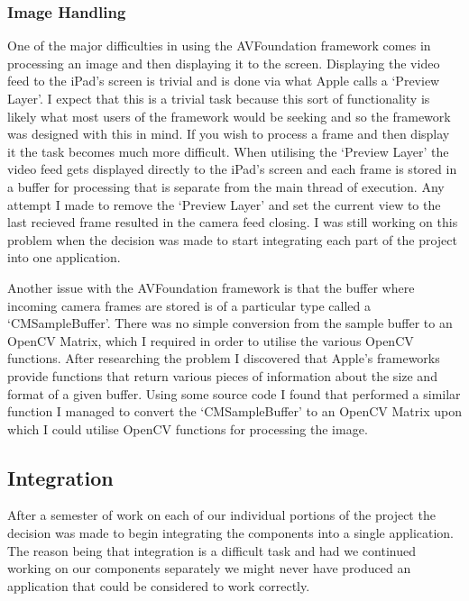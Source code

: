 \documentclass{article}
\begin{document}
\subsubsection{Image Handling}

One of the major difficulties in using the AVFoundation framework comes in processing an image and then displaying it to the screen. Displaying the video feed to the iPad's screen is trivial and is done via what Apple calls a `Preview Layer'. I expect that this is a trivial task because this sort of functionality is likely what most users of the framework would be seeking and so the framework was designed with this in mind. If you wish to process a frame and then display it the task becomes much more difficult. When utilising the `Preview Layer' the video feed gets displayed directly to the iPad's screen and each frame is stored in a buffer for processing that is separate from the main thread of execution. Any attempt I made to remove the `Preview Layer' and set the current view to the last recieved frame resulted in the camera feed closing. I was still working on this problem when the decision was made to start integrating each part of the project into one application.

Another issue with the AVFoundation framework is that the buffer where incoming camera frames are stored is of a particular type called a `CMSampleBuffer'. There was no simple conversion from the sample buffer to an OpenCV Matrix, which I required in order to utilise the various OpenCV functions. After researching the problem I discovered that Apple's frameworks provide functions that return various pieces of information about the size and format of a given buffer. Using some source code I found that performed a similar function %
I managed to convert the `CMSampleBuffer' to an OpenCV Matrix upon which I could utilise OpenCV functions for processing the image.


\subsection{Integration}

After a semester of work on each of our individual portions of the project the decision was made to begin integrating the components into a single application. The reason being that integration is a difficult task and had we continued working on our components separately we might never have produced an application that could be considered to work correctly.
\end{document}
